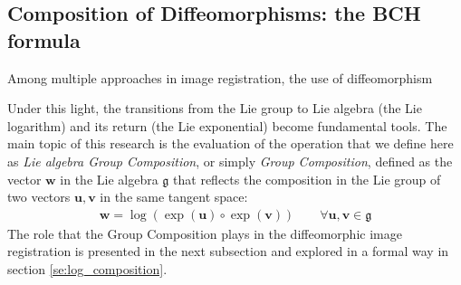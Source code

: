 

\subsection{Composition of Diffeomorphisms: the BCH formula}














Among multiple approaches in image registration, the use of diffeomorphism 


Under this light, the transitions from the Lie group to Lie algebra (the Lie logarithm) and its return (the Lie exponential) become fundamental tools.
The main topic of this research is the evaluation of the operation that we define here as \emph{Lie algebra Group Composition}, or simply \emph{Group Composition}, defined as the vector $\mathbf{w}$ in the Lie algebra $\mathfrak{g}$ that reflects the composition in the Lie group of two vectors $\mathbf{u}, \mathbf{v}$ in the same tangent space:
\begin{align*}
\mathbf{w} = \log(\exp(\mathbf{u})\circ\exp( \mathbf{v}))
\qquad
\forall \mathbf{u}, \mathbf{v} \in \mathfrak{g}
\end{align*}
The role that the Group Composition plays in the diffeomorphic image registration is presented in the next subsection and explored in a formal way in section \ref{se:log_composition}.










